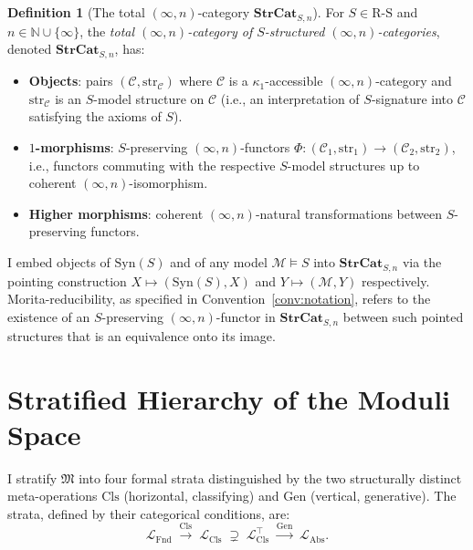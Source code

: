 \documentclass[11pt]{article}
\theoremstyle{plain}
\theoremstyle{definition}
\newtheorem{definition}[theorem]{Definition}
\newcommand{\RS}{\mathrm{R\text{-}S}}
\newcommand{\cM}{\mathcal{M}}
\newcommand{\cC}{\mathcal{C}}
\newcommand{\fM}{\mathfrak{M}}
\newcommand{\LFnd}{\mathcal{L}_{\mathrm{Fnd}}}
\newcommand{\LCls}{\mathcal{L}_{\mathrm{Cls}}}
\newcommand{\LClsMax}{\mathcal{L}_{\mathrm{Cls}}^{\top}}
\newcommand{\LAbs}{\mathcal{L}_{\mathrm{Abs}}}
\newcommand{\Syn}{\mathrm{Syn}}
\begin{document}
\begin{definition}[The total $(\infty, n)$-category $\mathbf{StrCat}_{S, n}$]\label{def:strcat}
For $S \in \RS$ and $n \in \mathbb{N} \cup \{\infty\}$, the \emph{total $(\infty, n)$-category of $S$-structured $(\infty, n)$-categories}, denoted $\mathbf{StrCat}_{S, n}$, has:
\begin{itemize}
\item \textbf{Objects}: pairs $(\cC, \mathrm{str}_\cC)$ where $\cC$ is a $\kappa_1$-accessible $(\infty, n)$-category and $\mathrm{str}_\cC$ is an $S$-model structure on $\cC$ (i.e., an interpretation of $S$-signature into $\cC$ satisfying the axioms of $S$).
\item \textbf{$1$-morphisms}: $S$-preserving $(\infty, n)$-functors $\Phi : (\cC_1, \mathrm{str}_1) \to (\cC_2, \mathrm{str}_2)$, i.e., functors commuting with the respective $S$-model structures up to coherent $(\infty, n)$-isomorphism.
\item \textbf{Higher morphisms}: coherent $(\infty, n)$-natural transformations between $S$-preserving functors.
\end{itemize}
I embed objects of $\Syn(S)$ and of any model $\cM \models S$ into $\mathbf{StrCat}_{S, n}$ via the pointing construction $X \mapsto (\Syn(S), X)$ and $Y \mapsto (\cM, Y)$ respectively. Morita-reducibility, as specified in Convention~\ref{conv:notation}, refers to the existence of an $S$-preserving $(\infty, n)$-functor in $\mathbf{StrCat}_{S, n}$ between such pointed structures that is an equivalence onto its image.
\end{definition}

\section{Stratified Hierarchy of the Moduli Space}\label{sec:hierarchy}

I stratify $\fM$ into four formal strata distinguished by the two structurally distinct meta-operations $\mathrm{Cls}$ (horizontal, classifying) and $\mathrm{Gen}$ (vertical, generative). The strata, defined by their categorical conditions, are:
\[
\LFnd \;\xrightarrow{\mathrm{Cls}}\; \LCls \;\supsetneq\; \LClsMax \;\xrightarrow{\mathrm{Gen}}\; \LAbs.
\]
\end{document}
